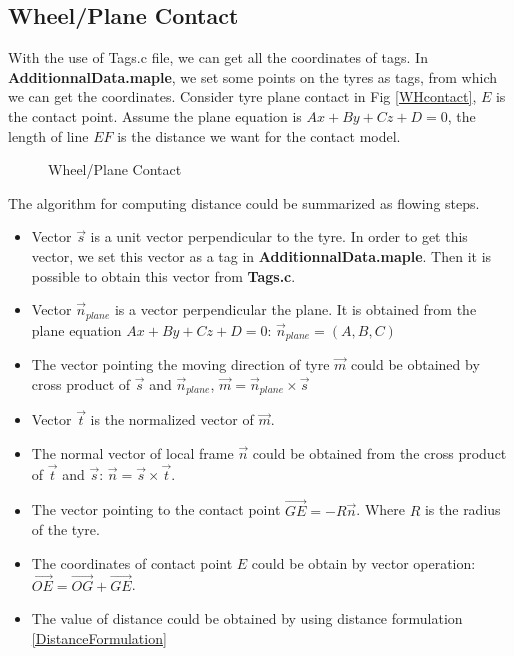 \subsection{Wheel/Plane Contact}
With the use of Tags.c file, we can get all the coordinates of tags. In \textbf{AdditionnalData.maple}, we set some points on the tyres as tags, from which we can get the coordinates. Consider tyre plane contact in Fig \eqref{WHcontact}, $E$ is the contact point. Assume the plane equation is $Ax+By+Cz+D=0$, the length of line $EF$ is the distance we want for the contact model.

\begin{figure}[H]
\begin{center}
 
\caption{Wheel/Plane Contact}
\label{WHcontact}
\end{center}
\end{figure}

The algorithm for computing distance could be summarized as flowing steps.

\begin{itemize}
\item Vector $\vec{s}$ is a unit vector perpendicular to the tyre. In order to get this vector, we set this vector as a tag in \textbf{AdditionnalData.maple}. Then it is possible to obtain this vector from \textbf{Tags.c}.
\item Vector $\vec{n}_{plane}$ is a vector perpendicular the plane. It is obtained from the plane equation $Ax+By+Cz+D=0$: $\vec{n}_{plane}=(A,B,C)$
\item The vector pointing the moving direction of tyre $\vec{m}$ could be obtained by cross product of  $\vec{s}$ and $\vec{n}_{plane}$, $\vec{m}=\vec{n}_{plane} \times \vec{s}$
\item Vector $\vec{t}$ is the normalized vector of $\vec{m}$.
\item The normal vector of local frame $\vec{n}$ could be obtained from the cross product of $\vec{t}$ and $\vec{s}$: $\vec{n}=\vec{s} \times \vec{t}$.
\item The vector pointing to the contact point $\overrightarrow{GE}=-R\vec{n}$. Where $R$ is the radius of the tyre.
\item The coordinates of contact point $E$ could be obtain by vector operation: $\overrightarrow{OE}=\overrightarrow{OG}+\overrightarrow{GE}$.
\item The value of distance could be obtained by using distance formulation \eqref{DistanceFormulation} 
\end{itemize}


